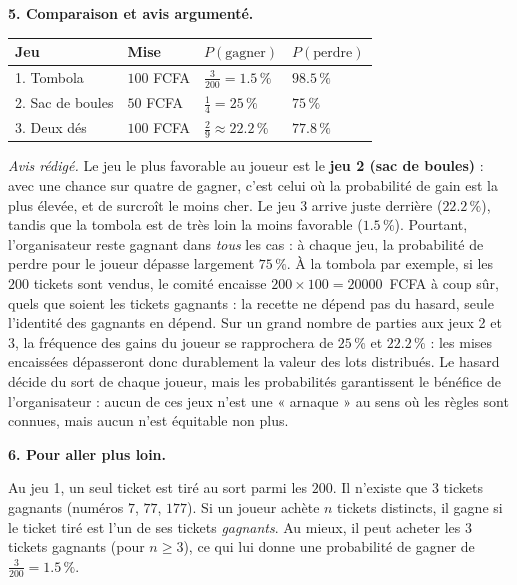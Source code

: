 \documentclass[11pt]{article}
\begin{document}
\begin{exoresolu}
\textbf{5. Comparaison et avis argumenté.}

\begin{center}
\begin{tabularx}{\linewidth}{|l|>{\centering\arraybackslash}X|>{\centering\arraybackslash}X|>{\centering\arraybackslash}X|}
\hline
\rowcolor{popblueL} \textbf{Jeu} & \textbf{Mise} & \textbf{$P(\text{gagner})$} & \textbf{$P(\text{perdre})$} \\
\hline
1. Tombola & $100$ FCFA & $\frac{3}{200}=\num{1,5}\,\%$ & $\num{98,5}\,\%$ \\
\hline
2. Sac de boules & $50$ FCFA & $\frac{1}{4}=\num{25}\,\%$ & $\num{75}\,\%$ \\
\hline
3. Deux dés & $100$ FCFA & $\frac{2}{9}\approx \num{22,2}\,\%$ & $\num{77,8}\,\%$ \\
\hline
\end{tabularx}
\end{center}

\emph{Avis rédigé.} Le jeu le plus favorable au joueur est le \textbf{jeu 2 (sac de boules)} : avec une chance sur quatre de gagner, c'est celui où la probabilité de gain est la plus élevée, et de surcroît le moins cher. Le jeu 3 arrive juste derrière ($\num{22,2}\,\%$), tandis que la tombola est de très loin la moins favorable ($\num{1,5}\,\%$). Pourtant, l'organisateur reste gagnant dans \emph{tous} les cas : à chaque jeu, la probabilité de perdre pour le joueur dépasse largement $75\,\%$. À la tombola par exemple, si les $200$ tickets sont vendus, le comité encaisse $200\times 100=\num{20000}$~FCFA à coup sûr, quels que soient les tickets gagnants : la recette ne dépend pas du hasard, seule l'identité des gagnants en dépend. Sur un grand nombre de parties aux jeux 2 et 3, la fréquence des gains du joueur se rapprochera de $\num{25}\,\%$ et $\num{22,2}\,\%$ : les mises encaissées dépasseront donc durablement la valeur des lots distribués. Le hasard décide du sort de chaque joueur, mais les probabilités garantissent le bénéfice de l'organisateur : aucun de ces jeux n'est une « arnaque » au sens où les règles sont connues, mais aucun n'est équitable non plus.

\textbf{6. Pour aller plus loin.}

Au jeu 1, un seul ticket est tiré au sort parmi les $200$. Il n'existe que $3$ tickets gagnants (numéros $7$, $77$, $177$). Si un joueur achète $n$ tickets distincts, il gagne si le ticket tiré est l'un de ses tickets \emph{gagnants}. Au mieux, il peut acheter les $3$ tickets gagnants (pour $n\ge 3$), ce qui lui donne une probabilité de gagner de $\frac{3}{200}=\num{1,5}\,\%$. 


\end{exoresolu}
\end{document}
